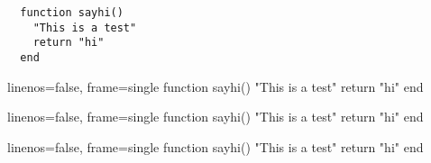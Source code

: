 \documentclass{article}
\begin{document}
\begin{verbatim}
  function sayhi()
    "This is a test"
    return "hi"
  end
\end{verbatim}

\begin{jlcode}{linenos=false, frame=single}
  function sayhi()
    "This is a test"
    return "hi"
  end
\end{jlcode}

\begin{juliablock*}{linenos=false, frame=single}
  function sayhi()
    "This is a test"
    return "hi"
  end
\end{juliablock*}

\begin{jlconverbatim}{linenos=false, frame=single}
  function sayhi()
    "This is a test"
    return "hi"
  end
\end{jlconverbatim}
\end{document}
